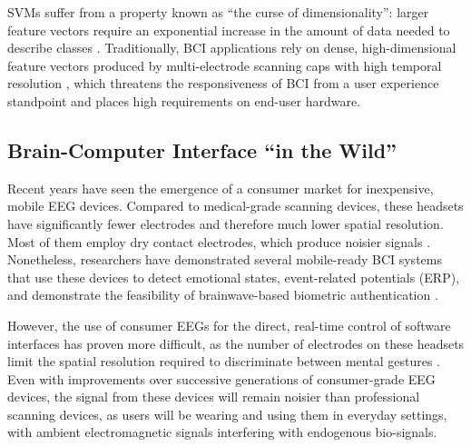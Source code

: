 SVMs suffer from a property known as ``the curse of dimensionality'': larger feature vectors require an exponential increase in the amount of data needed to describe classes \cite{jain_statistical_2000}. Traditionally, BCI applications rely on dense, high-dimensional feature vectors produced by multi-electrode scanning caps with high temporal resolution \cite{lotte_review_2007}, which threatens the responsiveness of BCI from a user experience standpoint and places high requirements on end-user hardware.

\subsection{Brain-Computer Interface ``in the Wild''}

\noindent Recent years have seen the emergence of a consumer market for inexpensive, mobile EEG devices. Compared to medical-grade scanning devices, these headsets have significantly fewer electrodes and therefore much lower spatial resolution. Most of them employ dry contact electrodes, which produce noisier signals \cite{de2014mobile}. Nonetheless, researchers have demonstrated several mobile-ready BCI systems that use these devices to detect emotional states, event-related potentials (ERP), and demonstrate the feasibility of brainwave-based biometric authentication \cite{crowley_evaluating_2010,grierson_better_2011,adams_i_2013,johnson2014}. 


However, the use of consumer EEGs for the direct, real-time control of software interfaces has proven more difficult, as the number of electrodes on these headsets limit the spatial resolution required to discriminate between mental gestures \cite{carrino_self-paced_2012,larsen_classification_2011}. Even with improvements over successive generations of consumer-grade EEG devices, the signal from these devices will remain noisier than professional scanning devices, as users will be wearing and using them in everyday settings, with ambient electromagnetic signals interfering with endogenous bio-signals.

